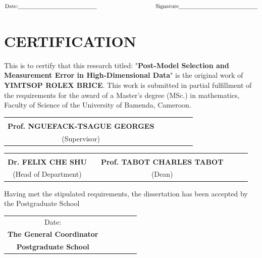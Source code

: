 \documentclass[a4paper,12pt,openany]{report}
\theoremstyle{plain}
\theoremstyle{plain}
\theoremstyle{plain}
\theoremstyle{plain}
\theoremstyle{plain}
\theoremstyle{plain}
\theoremstyle{plain}
\theoremstyle{plain}
\theoremstyle{plain}
\theoremstyle{plain}
\theoremstyle{plain}
\theoremstyle{plain}
\begin{document}
	\[\text{Date:\underline{\hspace*{5cm}} \hspace*{3.5 cm} Signature\underline{\hspace*{5cm}}}\] 		


	
\chapter*{CERTIFICATION}
\noindent
This is to certify that this research titled: "\textbf{Post-Model Selection and Measurement Error in High-Dimensional Data}" is the original work of \textbf{ YIMTSOP ROLEX BRICE}. This work is submitted in partial fulfillment of the requirements for the award of a Master's degree (MSc.) in mathematics, Faculty of Science of the University of Bamenda, Cameroon.


\vspace*{2 cm}
\begin{center}
	\begin{tabular}{cccccc}
	\underline{\hspace*{5cm}}\\ 
	\textbf{	Prof. NGUEFACK-TSAGUE GEORGES}\\
	(Supervisor) 	
	\end{tabular}
	
\end{center}
\vspace*{3 cm}
\begin{center}
	\begin{tabular}{cccccc}
		\underline{\hspace*{6cm}}&\hspace*{3cm}& \underline{\hspace*{6cm}}\\
		\textbf{Dr. FELIX CHE SHU} & \hspace*{1cm}& \textbf{Prof. TABOT CHARLES TABOT} \\
		(Head of Department) &  \hspace*{3cm} & (Dean)  \\	
	\end{tabular}	
\end{center}
Having met the stipulated requirements, the dissertation has been accepted by the Postgraduate School
\vspace*{2 cm}
\begin{center}
		\begin{tabular}{cccccc}
	Date:	\underline{\hspace*{5cm}}  \hspace*{5.2cm}   \underline{\hspace*{5cm}} \\
	\hspace*{5.8cm}   \hspace*{5.2cm}   \textbf{The General Coordinator}\\
	\hspace*{5.8cm}  \hspace*{4.8cm}   \textbf{Postgraduate School} \\	
		\end{tabular}
\end{center}
\end{document}

